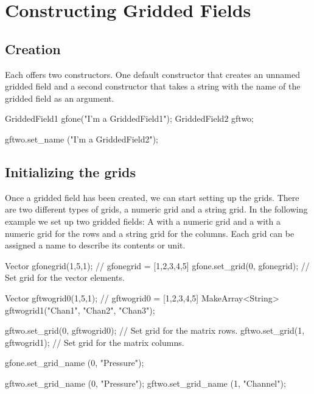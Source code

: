 \section{Constructing Gridded Fields}
\label{sec:griddedfields:construct}


\subsection{Creation}
\label{sec:griddedfields:create}

Each  offers two constructors. One default
constructor that creates an unnamed gridded field and a second constructor
that takes a string with the name of the gridded field as an argument.

\begin{code}
GriddedField1 gfone("I'm a GriddedField1");
GriddedField2 gftwo;

gftwo.set_name ("I'm a GriddedField2");
\end{code}


\subsection{Initializing the grids}
\label{sec:griddedfields:initgrids}

Once a gridded field has been created, we can start setting up the
grids. There are two different types of grids, a numeric grid and a
string grid. In the following example we set up two gridded fields: A
 with a numeric grid and a 
with a numeric grid for the rows and a string grid for the columns. Each grid
can be assigned a name to describe its contents or unit.

\begin{code}
Vector gfonegrid(1,5,1);        // gfonegrid = [1,2,3,4,5]
gfone.set_grid(0, gfonegrid);   // Set grid for the vector elements.

Vector gftwogrid0(1,5,1);       // gftwogrid0 = [1,2,3,4,5]
MakeArray<String> gftwogrid1("Chan1", "Chan2", "Chan3");

gftwo.set_grid(0, gftwogrid0);  // Set grid for the matrix rows.
gftwo.set_grid(1, gftwogrid1);  // Set grid for the matrix columns.

gfone.set_grid_name (0, "Pressure");

gftwo.set_grid_name (0, "Pressure");
gftwo.set_grid_name (1, "Channel");
\end{code}

